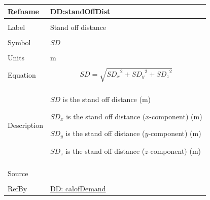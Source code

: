 \documentclass[12pt]{article}
\begin{document}
\noindent \begin{minipage}{\textwidth}
\begin{tabular}{>{\raggedright}p{}>{\raggedright\arraybackslash}p{}}
\toprule \textbf{Refname} & \textbf{DD:standOffDist}
\label{DD:standOffDist}
\\ \midrule \\
Label & Stand off distance
        
\\ \midrule \\
Symbol & $SD$
         
\\ \midrule \\
Units & m
        
\\ \midrule \\
Equation & \begin{displaymath}
           SD=\sqrt{{SD_{x}}^{2}+{SD_{y}}^{2}+{SD_{z}}^{2}}
           \end{displaymath}
\\ \midrule \\
Description & \begin{symbDescription}
              \item{$SD$ is the stand off distance (m)}
              \item{${SD_{x}}$ is the stand off distance ($x$-component) (m)}
              \item{${SD_{y}}$ is the stand off distance ($y$-component) (m)}
              \item{${SD_{z}}$ is the stand off distance ($z$-component) (m)}
              \end{symbDescription}
\\ \midrule \\
Source & \cite{astm2009}
         
\\ \midrule \\
RefBy & \hyperref[DD:calofDemand]{DD: calofDemand}
        
\\ \bottomrule
\end{tabular}
\end{minipage}
\end{document}
